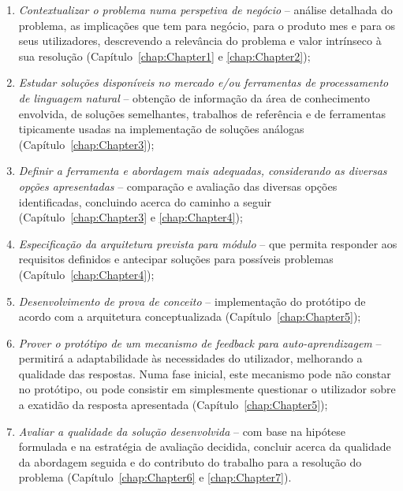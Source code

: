 \begin{enumerate}
    \item
    {
        \textit{Contextualizar o problema numa perspetiva de negócio} -- análise detalhada do problema, as implicações que tem para negócio, para o produto \gls{mes} e para os seus utilizadores, descrevendo a relevância do problema e valor intrínseco à sua resolução (Capítulo~\ref{chap:Chapter1} e \ref{chap:Chapter2});
    }
    \item
    {
        \textit{Estudar soluções disponíveis no mercado e/ou ferramentas de processamento de linguagem natural} -- obtenção de informação da área de conhecimento envolvida, de soluções semelhantes, trabalhos de referência e de ferramentas tipicamente usadas na implementação de soluções análogas (Capítulo~\ref{chap:Chapter3});
    }
    \item
    {
        \textit{Definir a ferramenta e abordagem mais adequadas, considerando as diversas opções apresentadas} -- comparação e avaliação das diversas opções identificadas, concluindo acerca do caminho a seguir (Capítulo~\ref{chap:Chapter3} e \ref{chap:Chapter4});
    }
    \item
    {
        \textit{Especificação da arquitetura prevista para módulo} -- que permita responder aos requisitos definidos e antecipar soluções para possíveis problemas (Capítulo~\ref{chap:Chapter4});
    }
    \item
    {
        \textit{Desenvolvimento de prova de conceito} -- implementação do protótipo de acordo com a arquitetura conceptualizada (Capítulo~\ref{chap:Chapter5});
    }
    \item
    {
        \textit{Prover o protótipo de um mecanismo de feedback para auto-aprendizagem} -- permitirá a adaptabilidade às necessidades do utilizador, melhorando a qualidade das respostas.
        Numa fase inicial, este mecanismo pode não constar no protótipo, ou pode consistir em simplesmente questionar o utilizador sobre a exatidão da resposta apresentada (Capítulo~\ref{chap:Chapter5});
    }
    \item
    {
        \textit{Avaliar a qualidade da solução desenvolvida} -- com base na hipótese formulada e na estratégia de avaliação decidida, concluir acerca da qualidade da abordagem seguida e do contributo do trabalho para a resolução do problema (Capítulo~\ref{chap:Chapter6} e \ref{chap:Chapter7}).
    }
\end{enumerate}

